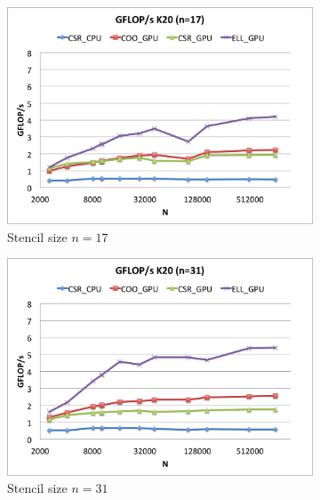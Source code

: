 \documentclass{report}
\begin{document}
\begin{figure} 
\centering
\begin{subfigure}[t]{0.48\textwidth}
\centering
\includegraphics[width=\textwidth]{gpu_content/cascade_spmv/gflops_cascade_k20_n17.png}
\caption{Stencil size $n=17$}
\end{subfigure}
\quad
\begin{subfigure}[t]{0.48\textwidth}
\centering
\includegraphics[width=\textwidth]{gpu_content/cascade_spmv/gflops_cascade_k20_n31.png}
\caption{Stencil size $n=31$}
\end{subfigure}
\begin{subfigure}[t]{0.48\textwidth}
\centering

\end{subfigure}
\end{figure}
\end{document}
